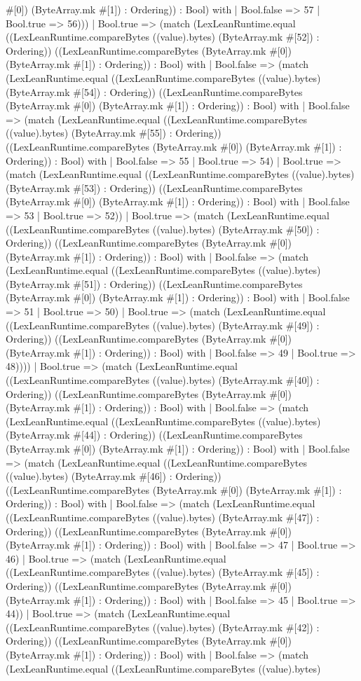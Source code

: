 \documentclass[11pt]{article}
\begin{document}
\#[0]) (ByteArray.mk \#[1]) : Ordering)) : Bool) with | Bool.false => 57 | Bool.true => 56))) | Bool.true => (match (LexLeanRuntime.equal ((LexLeanRuntime.compareBytes ((value).bytes) (ByteArray.mk \#[52]) : Ordering)) ((LexLeanRuntime.compareBytes (ByteArray.mk \#[0]) (ByteArray.mk \#[1]) : Ordering)) : Bool) with | Bool.false => (match (LexLeanRuntime.equal ((LexLeanRuntime.compareBytes ((value).bytes) (ByteArray.mk \#[54]) : Ordering)) ((LexLeanRuntime.compareBytes (ByteArray.mk \#[0]) (ByteArray.mk \#[1]) : Ordering)) : Bool) with | Bool.false => (match (LexLeanRuntime.equal ((LexLeanRuntime.compareBytes ((value).bytes) (ByteArray.mk \#[55]) : Ordering)) ((LexLeanRuntime.compareBytes (ByteArray.mk \#[0]) (ByteArray.mk \#[1]) : Ordering)) : Bool) with | Bool.false => 55 | Bool.true => 54) | Bool.true => (match (LexLeanRuntime.equal ((LexLeanRuntime.compareBytes ((value).bytes) (ByteArray.mk \#[53]) : Ordering)) ((LexLeanRuntime.compareBytes (ByteArray.mk \#[0]) (ByteArray.mk \#[1]) : Ordering)) : Bool) with | Bool.false => 53 | Bool.true => 52)) | Bool.true => (match (LexLeanRuntime.equal ((LexLeanRuntime.compareBytes ((value).bytes) (ByteArray.mk \#[50]) : Ordering)) ((LexLeanRuntime.compareBytes (ByteArray.mk \#[0]) (ByteArray.mk \#[1]) : Ordering)) : Bool) with | Bool.false => (match (LexLeanRuntime.equal ((LexLeanRuntime.compareBytes ((value).bytes) (ByteArray.mk \#[51]) : Ordering)) ((LexLeanRuntime.compareBytes (ByteArray.mk \#[0]) (ByteArray.mk \#[1]) : Ordering)) : Bool) with | Bool.false => 51 | Bool.true => 50) | Bool.true => (match (LexLeanRuntime.equal ((LexLeanRuntime.compareBytes ((value).bytes) (ByteArray.mk \#[49]) : Ordering)) ((LexLeanRuntime.compareBytes (ByteArray.mk \#[0]) (ByteArray.mk \#[1]) : Ordering)) : Bool) with | Bool.false => 49 | Bool.true => 48)))) | Bool.true => (match (LexLeanRuntime.equal ((LexLeanRuntime.compareBytes ((value).bytes) (ByteArray.mk \#[40]) : Ordering)) ((LexLeanRuntime.compareBytes (ByteArray.mk \#[0]) (ByteArray.mk \#[1]) : Ordering)) : Bool) with | Bool.false => (match (LexLeanRuntime.equal ((LexLeanRuntime.compareBytes ((value).bytes) (ByteArray.mk \#[44]) : Ordering)) ((LexLeanRuntime.compareBytes (ByteArray.mk \#[0]) (ByteArray.mk \#[1]) : Ordering)) : Bool) with | Bool.false => (match (LexLeanRuntime.equal ((LexLeanRuntime.compareBytes ((value).bytes) (ByteArray.mk \#[46]) : Ordering)) ((LexLeanRuntime.compareBytes (ByteArray.mk \#[0]) (ByteArray.mk \#[1]) : Ordering)) : Bool) with | Bool.false => (match (LexLeanRuntime.equal ((LexLeanRuntime.compareBytes ((value).bytes) (ByteArray.mk \#[47]) : Ordering)) ((LexLeanRuntime.compareBytes (ByteArray.mk \#[0]) (ByteArray.mk \#[1]) : Ordering)) : Bool) with | Bool.false => 47 | Bool.true => 46) | Bool.true => (match (LexLeanRuntime.equal ((LexLeanRuntime.compareBytes ((value).bytes) (ByteArray.mk \#[45]) : Ordering)) ((LexLeanRuntime.compareBytes (ByteArray.mk \#[0]) (ByteArray.mk \#[1]) : Ordering)) : Bool) with | Bool.false => 45 | Bool.true => 44)) | Bool.true => (match (LexLeanRuntime.equal ((LexLeanRuntime.compareBytes ((value).bytes) (ByteArray.mk \#[42]) : Ordering)) ((LexLeanRuntime.compareBytes (ByteArray.mk \#[0]) (ByteArray.mk \#[1]) : Ordering)) : Bool) with | Bool.false => (match (LexLeanRuntime.equal ((LexLeanRuntime.compareBytes ((value).bytes) 
\end{document}
